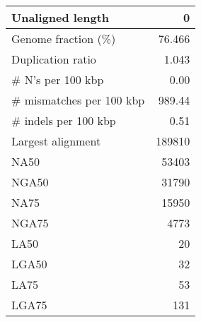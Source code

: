 \documentclass[12pt,a4paper]{article}
\begin{document}
\begin{table}[ht]
\begin{center}
\begin{tabular}{|l*{1}{|r}|}
Unaligned length & 0 \\ \hline
Genome fraction (\%) & 76.466 \\ \hline
Duplication ratio & 1.043 \\ \hline
\# N's per 100 kbp & 0.00 \\ \hline
\# mismatches per 100 kbp & 989.44 \\ \hline
\# indels per 100 kbp & 0.51 \\ \hline
Largest alignment & 189810 \\ \hline
NA50 & 53403 \\ \hline
NGA50 & 31790 \\ \hline
NA75 & 15950 \\ \hline
NGA75 & 4773 \\ \hline
LA50 & 20 \\ \hline
LGA50 & 32 \\ \hline
LA75 & 53 \\ \hline
LGA75 & 131 \\ \hline
\end{tabular}
\end{center}
\end{table}
\end{document}

